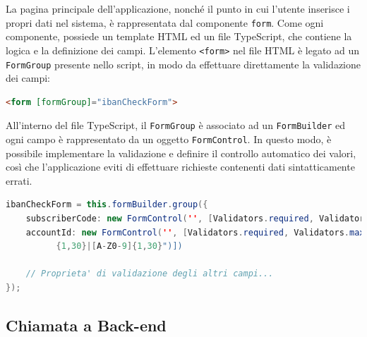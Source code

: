 La pagina principale dell’applicazione, nonché il punto in cui l’utente inserisce i propri dati nel sistema, è rappresentata dal componente \texttt{form}. Come ogni componente, possiede un template HTML ed un file TypeScript, che contiene la logica e la definizione dei campi.
L’elemento \texttt{<form>} nel file HTML è legato ad un \texttt{FormGroup} presente nello script, in modo da effettuare direttamente la validazione dei campi:
\begin{lstlisting}[language=HTML, caption=\textit{Binding} dell'elemento \texttt{form} tra HTML e TypeScript.]
<form [formGroup]="ibanCheckForm">
\end{lstlisting}
All’interno del file TypeScript, il \texttt{FormGroup} è associato ad un \texttt{FormBuilder} ed ogni campo è rappresentato da un oggetto \texttt{FormControl}. In questo modo, è possibile implementare la validazione e definire il controllo automatico dei valori, così che l’applicazione eviti di effettuare richieste contenenti dati sintatticamente errati.
\begin{lstlisting}[language=Java, caption=Codice TypeScript che realizza la validazione di alcuni campi del \texttt{form}.]
ibanCheckForm = this.formBuilder.group({
    subscriberCode: new FormControl('', [Validators.required, Validators.maxLength(20)]),
    accountId: new FormControl('', [Validators.required, Validators.maxLength(34), Validators.pattern("[A-Z]{2}[0-9]{2}[A-Z0-9]
          {1,30}|[A-Z0-9]{1,30}")])
    
    // Proprieta' di validazione degli altri campi...
});
\end{lstlisting}

\subsection{Chiamata a Back-end}


